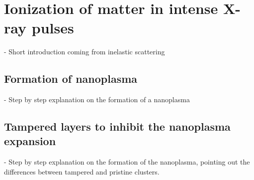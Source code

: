 \section{Ionization of matter in intense X-ray pulses}
- Short introduction coming from inelastic scattering
\subsection{Formation of nanoplasma}
- Step by step explanation on the formation of a nanoplasma
\subsection{Tampered layers to inhibit the nanoplasma expansion}
- Step by step explanation on the formation of the nanoplasma, pointing out the differences between tampered and pristine clusters.